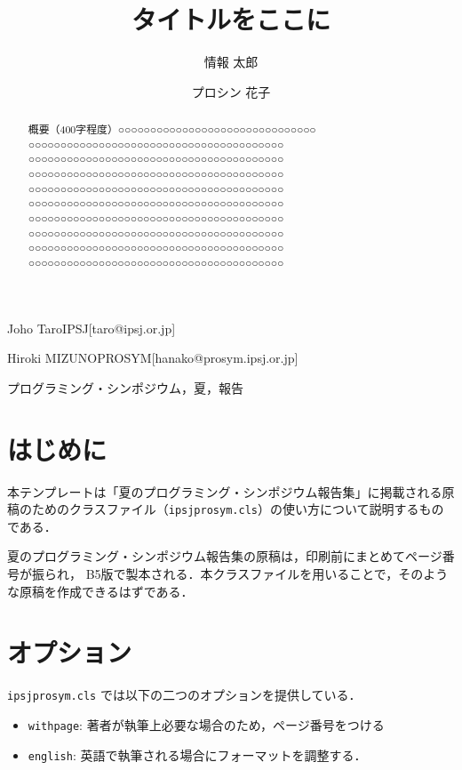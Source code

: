 \documentclass{ipsjprosym}
\begin{document}
\title{タイトルをここに}


\author{情報 太郎}{Joho Taro}{IPSJ}[taro@ipsj.or.jp]
\author{プロシン 花子}{Hiroki MIZUNO}{PROSYM}[hanako@prosym.ipsj.or.jp]

\begin{abstract}
概要（400字程度）○○○○○○○○○○○○○○○○○○○○○○○○○○○○○○○
○○○○○○○○○○○○○○○○○○○○○○○○○○○○○○○○○○○○○○○○
○○○○○○○○○○○○○○○○○○○○○○○○○○○○○○○○○○○○○○○○
○○○○○○○○○○○○○○○○○○○○○○○○○○○○○○○○○○○○○○○○
○○○○○○○○○○○○○○○○○○○○○○○○○○○○○○○○○○○○○○○○
○○○○○○○○○○○○○○○○○○○○○○○○○○○○○○○○○○○○○○○○
○○○○○○○○○○○○○○○○○○○○○○○○○○○○○○○○○○○○○○○○
○○○○○○○○○○○○○○○○○○○○○○○○○○○○○○○○○○○○○○○○
○○○○○○○○○○○○○○○○○○○○○○○○○○○○○○○○○○○○○○○○
○○○○○○○○○○○○○○○○○○○○○○○○○○○○○○○○○○○○○○○○
\end{abstract}

\begin{jkeyword}
プログラミング・シンポジウム，夏，報告
\end{jkeyword}

\maketitle

\section{はじめに}

本テンプレートは「夏のプログラミング・シンポジウム報告集」に掲載される原
稿のためのクラスファイル（\verb|ipsjprosym.cls|）の使い方について説明するものである．

夏のプログラミング・シンポジウム報告集の原稿は，印刷前にまとめてページ番号が振られ，
B5版で製本される．本クラスファイルを用いることで，そのような原稿を作成できるはずである．

\section{オプション}

\verb|ipsjprosym.cls| では以下の二つのオプションを提供している．
\begin{itemize}
 \item \verb|withpage|: 著者が執筆上必要な場合のため，ページ番号をつける
 \item \verb|english|: 英語で執筆される場合にフォーマットを調整する．
\end{itemize}
\end{document}
